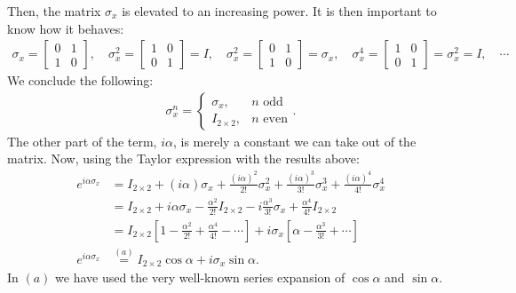 \documentclass[letterpaper,11pt,twoside]{article}
\begin{document}
Then, the matrix $\sigma_x$ is elevated to an increasing power. It is then important to know how it behaves:
\begin{align*}
  \sigma_x=\begin{bmatrix}
    0&1\\1&0
  \end{bmatrix},\quad\sigma_x^2=\begin{bmatrix}
    1&0\\0&1
  \end{bmatrix}=I,\quad\sigma_x^2=\begin{bmatrix}
    0&1\\1&0
  \end{bmatrix}=\sigma_x,\quad \sigma_x^4=\begin{bmatrix}
    1&0\\0&1
  \end{bmatrix}=\sigma_x^2=I,\quad\cdots
\end{align*}
We conclude the following:
\begin{align*}
  \sigma^n_x=\begin{cases}
    \sigma_x,&\text{$n$ odd}\\
    I_{2\times2},&\text{$n$ even}
  \end{cases}.
\end{align*}
The other part of the term, $i\alpha$, is merely a constant we can take out of the matrix. Now, using the Taylor expression with the results above:
\begin{align*}
  e^{i\alpha\sigma_x}&=I_{2\times2}+(i\alpha)\sigma_x+\frac{(i\alpha)^2}{2!}\sigma_x^2+\frac{(i\alpha)^3}{3!}\sigma_x^3+\frac{(i\alpha)^4}{4!}\sigma_x^4\\
  &=I_{2\times2}+i\alpha\sigma_x-\frac{\alpha^2}{2!}I_{2\times2}-i\frac{\alpha^3}{3!}\sigma_x+\frac{\alpha^4}{4!}I_{2\times2}\\
  &=I_{2\times2}\left[1-\frac{\alpha^2}{2!}+\frac{\alpha^4}{4!}-\cdots\right]+i\sigma_x\left[\alpha-\frac{\alpha^3}{3!}+\cdots\right]\\
  e^{i\alpha\sigma_x}&\stackrel{(a)}{=}I_{2\times2}\cos\alpha+i\sigma_x\sin\alpha.
\end{align*}
In $(a)$ we have used the very well-known series expansion of $\cos\alpha$ and $\sin\alpha$.
%
\end{document}
